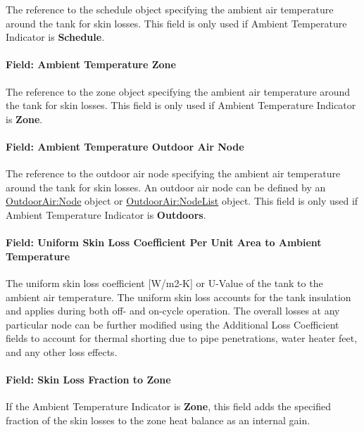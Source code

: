 The reference to the schedule object specifying the ambient air temperature around the tank for skin losses. This field is only used if Ambient Temperature Indicator is \textbf{Schedule}.

\paragraph{Field: Ambient Temperature Zone}\label{field-ambient-temperature-zone}

The reference to the zone object specifying the ambient air temperature around the tank for skin losses. This field is only used if Ambient Temperature Indicator is \textbf{Zone}.

\paragraph{Field: Ambient Temperature Outdoor Air Node}\label{field-ambient-temperature-outdoor-air-node}

The reference to the outdoor air node specifying the ambient air temperature around the tank for skin losses. An outdoor air node can be defined by an \hyperref[outdoorairnode]{OutdoorAir:Node} object or \hyperref[outdoorairnodelist]{OutdoorAir:NodeList} object. This field is only used if Ambient Temperature Indicator is \textbf{Outdoors}.

\paragraph{Field: Uniform Skin Loss Coefficient Per Unit Area to Ambient Temperature}\label{field-uniform-skin-loss-coefficient-per-unit-area-to-ambient-temperature-000}

The uniform skin loss coefficient {[}W/m2-K{]} or U-Value of the tank to the ambient air temperature. The uniform skin loss accounts for the tank insulation and applies during both off- and on-cycle operation. The overall losses at any particular node can be further modified using the Additional Loss Coefficient fields to account for thermal shorting due to pipe penetrations, water heater feet, and any other loss effects.

\paragraph{Field: Skin Loss Fraction to Zone}\label{field-skin-loss-fraction-to-zone}

If the Ambient Temperature Indicator is \textbf{Zone}, this field adds the specified fraction of the skin losses to the zone heat balance as an internal gain.

